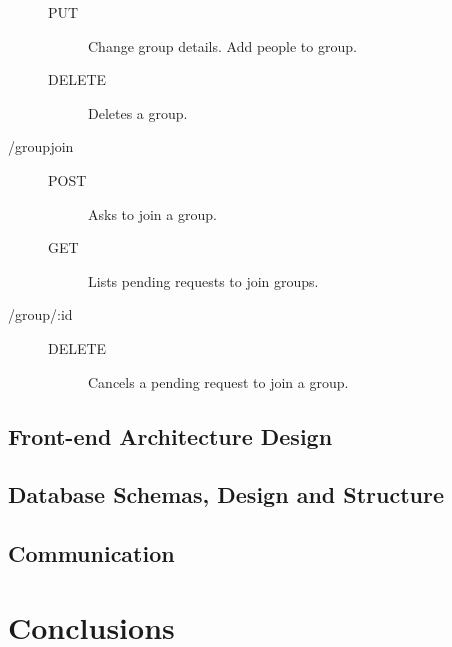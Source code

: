 \begin{description}
\begin{description}
      \item [PUT] Change group details. Add people to group.
      \item [DELETE] Deletes a group.
    \end{description}
  \item [/groupjoin] \hfill
    \begin{description}
      \item [POST] Asks to join a group.
      \item [GET] Lists pending requests to join groups.
    \end{description}
  \item [/group/:id] \hfill
    \begin{description}
      \item [DELETE] Cancels a pending request to join a group.
    \end{description}
\end{description}

\subsection{Front-end Architecture Design}


\subsection{Database Schemas, Design and Structure}


\subsection{Communication}


\section{Conclusions}


